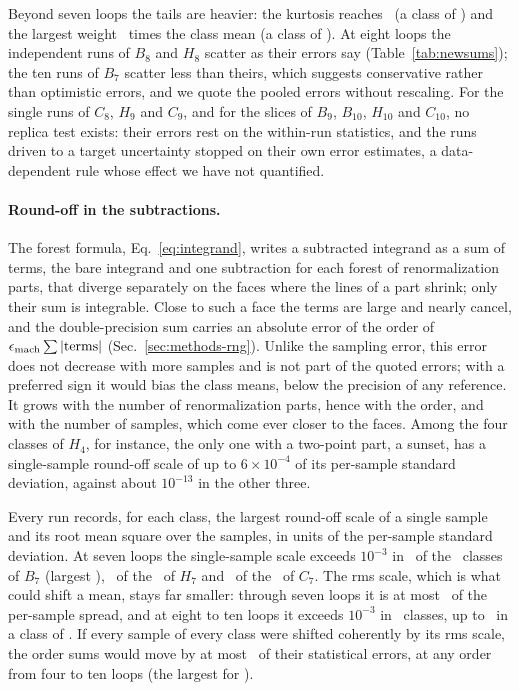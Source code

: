 Beyond seven loops the tails are heavier: the kurtosis reaches \kurtmaxhigh\ (a class of \kurtmaxhighorder) and the
largest weight \wmaxmaxhigh\ times the class mean (a class of \wmaxmaxhighorder). At eight loops the independent runs
of $B_8$ and $H_8$ scatter as their errors say (Table~\ref{tab:newsums}); the ten runs of $B_7$ scatter less than
theirs, which suggests conservative rather than optimistic errors, and we quote the pooled errors without rescaling.
For the single runs of $C_8$, $H_9$ and $C_9$, and for the slices of $B_9$, $B_{10}$, $H_{10}$ and $C_{10}$, no replica
test exists: their errors rest on the within-run statistics, and the runs driven to a target uncertainty stopped on
their own error estimates, a data-dependent rule whose effect we have not quantified.

\paragraph{Round-off in the subtractions.}
The forest formula, Eq.~\eqref{eq:integrand}, writes a subtracted integrand as a sum of terms, the bare integrand and
one subtraction for each forest of renormalization parts, that diverge separately on the faces where the lines of a
part shrink; only their sum is integrable. Close to such a face the terms are large and nearly cancel, and the
double-precision sum carries an absolute error of the order of $\epsilon_{\rm mach}\sum|\text{terms}|$
(Sec.~\ref{sec:methods-rng}). Unlike the sampling error, this error does not decrease with more samples and is not part
of the quoted errors; with a preferred sign it would bias the class means, below the precision of any reference. It
grows with the number of renormalization parts, hence with the order, and with the number of samples, which come ever
closer to the faces. Among the four classes of $H_4$, for instance, the only one with a two-point part, a sunset, has a
single-sample round-off scale of up to $6\times10^{-4}$ of its per-sample standard deviation, against about
$10^{-13}$ in the other three.

Every run records, for each class, the largest round-off scale of a single sample and its root mean square over the
samples, in units of the per-sample standard deviation. At seven loops the single-sample scale exceeds $10^{-3}$ in
\rmaxcountBseven\ of the \nclBseven\ classes of $B_7$ (largest \rmaxmaxBseven), \rmaxcountHseven\ of the \nclHseven\ of
$H_7$ and \rmaxcountCseven\ of the \nclCseven\ of $C_7$. The rms scale, which is what could shift a mean, stays far
smaller: through seven loops it is at most \rmsmaxlow\ of the per-sample spread, and at eight to ten loops it exceeds
$10^{-3}$ in \rmscounthigh\ classes, up to \rmsmaxhigh\ in a class of \rmsmaxhighorder. If every sample of every class
were shifted coherently by its rms scale, the order sums would move by at most \rcohmax\ of their statistical errors,
at any order from four to ten loops (the largest for \rcohmaxorder).

